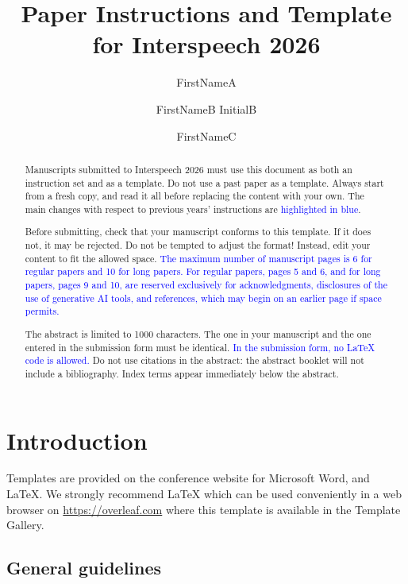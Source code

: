 \documentclass[cameraready]{Interspeech}
\title{Paper Instructions and Template for Interspeech 2026}
\author[affiliation={1}, orcid=0000-0000-0000-0000, equalcontribution]{FirstNameA}{LastNameA}
\author[affiliation={2,3}, orcid=0000-0000-0000-1111, equalcontribution, correspondingauthor]{FirstNameB InitialB}{LastNameB}
\author[affiliation={1,3}]{FirstNameC}{LastNameC}
\newcommand{\blue}[1]{\textcolor{blue}{#1}}
\begin{document}
\maketitle

\begin{abstract}
    Manuscripts submitted to Interspeech 2026 must use this document as both an instruction set and as a template. Do not use a past paper as a template. Always start from a fresh copy, and read it all before replacing the content with your own. The main changes with respect to previous years' instructions are \blue{highlighted in blue}.

    Before submitting, check that your manuscript conforms to this template. If it does not, it may be rejected. Do not be tempted to adjust the format! Instead, edit your content to fit the allowed space. \blue{The maximum number of manuscript pages is 6 for regular papers and 10 for long papers. For regular papers, pages 5 and 6, and for long papers, pages 9 and 10, are reserved exclusively for acknowledgments, disclosures of the use of generative AI tools, and references, which may begin on an earlier page if space permits.}

    The abstract is limited to 1000 characters. The one in your manuscript and the one entered in the submission form must be identical. \blue{In the submission form, no \LaTeX{} code is allowed.} Do not use citations in the abstract: the abstract booklet will not include a bibliography. Index terms appear immediately below the abstract.
\end{abstract}



\section{Introduction}

Templates are provided on the conference website for Microsoft Word\textregistered, and \LaTeX. We strongly recommend \LaTeX\xspace
which can be used conveniently in a web browser on \url{https://overleaf.com} where this template is available in the Template Gallery.

\subsection{General guidelines}
\end{document}
